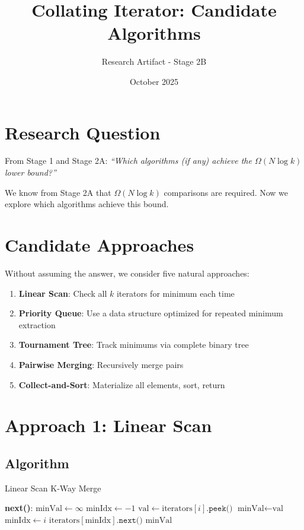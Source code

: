 \documentclass[11pt]{article}
\title{Collating Iterator: Candidate Algorithms}
\author{Research Artifact - Stage 2B}
\date{October 2025}
\begin{document}
\maketitle

\section{Research Question}

From Stage 1 and Stage 2A: \textit{``Which algorithms (if any) achieve the $\Omega(N \log k)$ lower bound?''}

We know from Stage 2A that $\Omega(N \log k)$ comparisons are required. Now we explore which algorithms achieve this bound.

\section{Candidate Approaches}

Without assuming the answer, we consider five natural approaches:

\begin{enumerate}
    \item \textbf{Linear Scan}: Check all $k$ iterators for minimum each time
    \item \textbf{Priority Queue}: Use a data structure optimized for repeated minimum extraction
    \item \textbf{Tournament Tree}: Track minimums via complete binary tree
    \item \textbf{Pairwise Merging}: Recursively merge pairs
    \item \textbf{Collect-and-Sort}: Materialize all elements, sort, return
\end{enumerate}

\section{Approach 1: Linear Scan}

\subsection{Algorithm}

\begin{algorithm}
\caption{Linear Scan K-Way Merge}
\begin{algorithmic}[1]
\State \textbf{next()}:
\State $\text{minVal} \gets \infty$
\State $\text{minIdx} \gets -1$
        \State $\text{val} \gets \text{iterators}[i].\texttt{peek()}$
            \State $\text{minVal} \gets \text{val}$
            \State $\text{minIdx} \gets i$
        \EndIf
    \EndIf
\EndFor
\State $\text{iterators}[\text{minIdx}].\texttt{next()}$
\State \Return $\text{minVal}$
\end{algorithmic}
\end{algorithm}
\end{document}
